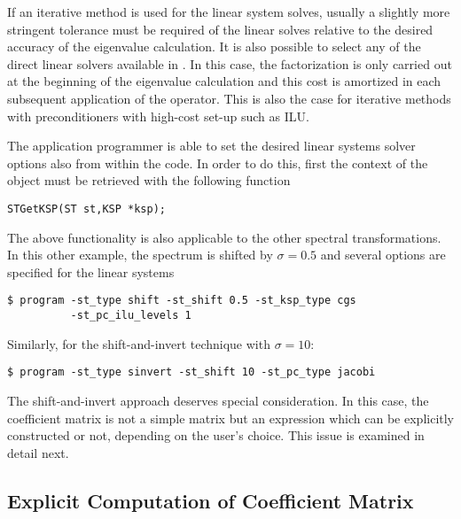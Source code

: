 	If an iterative method is used for the linear system solves, usually a slightly more stringent tolerance must be required of the linear solves relative to the desired accuracy of the eigenvalue calculation. It is also possible to select any of the direct linear solvers available in \petsc. In this case, the factorization is only carried out at the beginning of the eigenvalue calculation and this cost is amortized in each subsequent application of the operator. This is also the case for iterative methods with preconditioners with high-cost set-up such as ILU.

	The application programmer is able to set the desired linear systems solver options also from within the code. In order to do this, first the context of the  object must be retrieved with the following function
	\begin{Verbatim}[fontsize=\small]
	STGetKSP(ST st,KSP *ksp);
	\end{Verbatim}
	
	The above functionality is also applicable to the other spectral transformations. In this other example, the spectrum is shifted by $\sigma=0.5$ and several options are specified for the linear systems
\begin{Verbatim}[fontsize=\small]
	$ program -st_type shift -st_shift 0.5 -st_ksp_type cgs 
		  -st_pc_ilu_levels 1
\end{Verbatim}

	Similarly, for the shift-and-invert technique with $\sigma=10$:
\begin{Verbatim}[fontsize=\small]
	$ program -st_type sinvert -st_shift 10 -st_pc_type jacobi
\end{Verbatim}
	The shift-and-invert approach deserves special consideration. In this case, the coefficient matrix is not a simple matrix but an expression which can be explicitly constructed or not, depending on the user's choice. This issue is examined in detail next.

\subsection{Explicit Computation of Coefficient Matrix}
\label{sec:explicit}

